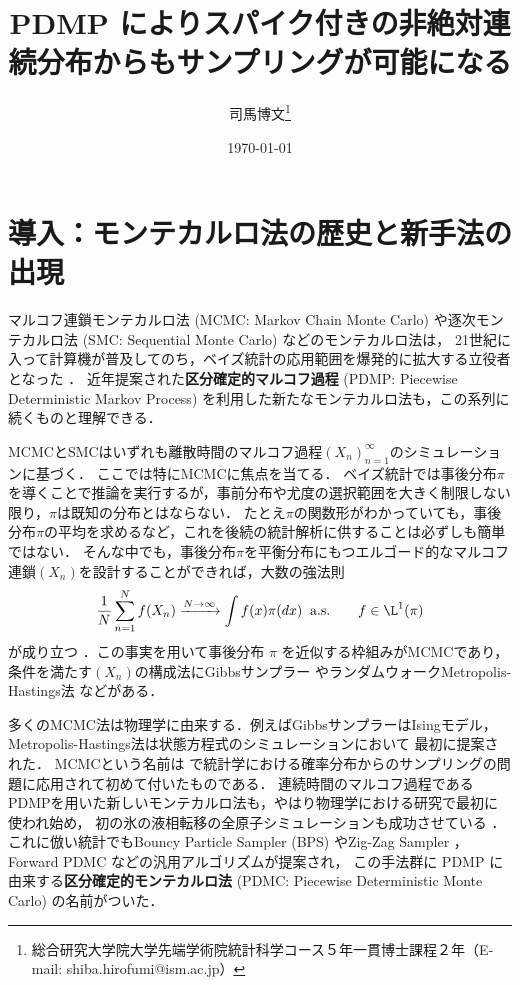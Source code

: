 \documentclass[lualatex,dfipdfmx,ja=standard]{bxjsarticle}
\title{\Large PDMP によりスパイク付きの非絶対連続分布からもサンプリングが可能になる}\author{司馬博文\thanks{総合研究大学院大学先端学術院統計科学コース５年一貫博士課程２年（E-mail: shiba.hirofumi@ism.ac.jp）}}\date{\today}
\begin{document}
\maketitle

\section{導入：モンテカルロ法の歴史と新手法の出現}

マルコフ連鎖モンテカルロ法 (MCMC: Markov Chain Monte Carlo) や逐次モンテカルロ法 (SMC: Sequential Monte Carlo) などのモンテカルロ法は，
21世紀に入って計算機が普及してのち，ベイズ統計の応用範囲を爆発的に拡大する立役者となった \cite{InPractice1996,Doucet+2001}．
近年提案された\textbf{区分確定的マルコフ過程} (PDMP: Piecewise Deterministic Markov Process) を利用した新たなモンテカルロ法も，この系列に続くものと理解できる．

MCMCとSMCはいずれも離散時間のマルコフ過程$(X_n)_{n=1}^\infty$のシミュレーションに基づく．
ここでは特にMCMCに焦点を当てる．
ベイズ統計では事後分布$\pi$を導くことで推論を実行するが，事前分布や尤度の選択範囲を大きく制限しない限り，$\pi$は既知の分布とはならない．
たとえ$\pi$の関数形がわかっていても，事後分布$\pi$の平均を求めるなど，これを後続の統計解析に供することは必ずしも簡単ではない．
そんな中でも，事後分布$\pi$を平衡分布にもつエルゴード的なマルコフ連鎖$(X_n)$を設計することができれば，大数の強法則
$$
\frac{1}{N}\sum_{n=1}^Nf(X_n)\xrightarrow{N\to\infty}\int f(x)\pi(dx)\;\as\qquad f\in\L^1(\pi)
$$
が成り立つ \cite[pp.175-176]{Kulik2018}．この事実を用いて事後分布 $\pi$ を近似する枠組みがMCMCであり，
条件を満たす$(X_n)$の構成法にGibbsサンプラー \cite{Geman-Geman1984} やランダムウォークMetropolis-Hastings法 \cite{Hastings1970} などがある．

多くのMCMC法は物理学に由来する．例えばGibbsサンプラーはIsingモデル\cite{Glauber1963}，Metropolis-Hastings法は状態方程式\cite{Metropolis+1953}のシミュレーションにおいて
最初に提案された．
MCMCという名前は \cite{Geman-Geman1984,Hastings1970} で統計学における確率分布からのサンプリングの問題に応用されて初めて付いたものである．
連続時間のマルコフ過程であるPDMPを用いた新しいモンテカルロ法も，やはり物理学における研究\cite{Bernard+2009,Peters-deWith2012}で最初に使われ始め，
初の氷の液相転移の全原子シミュレーションも成功させている \cite{Faulkner+2018}．
これに倣い統計でもBouncy Particle Sampler (BPS) \cite{Bouchard-Cote+2018-BPS}やZig-Zag Sampler \cite{Bierkens+2019}，Forward PDMC \cite{Michel+2020}などの汎用アルゴリズムが提案され，
この手法群に PDMP に由来する\textbf{区分確定的モンテカルロ法} (PDMC: Piecewise Deterministic Monte Carlo) の名前がついた．
\end{document}
